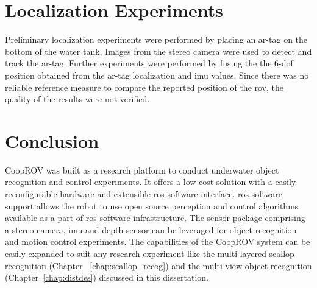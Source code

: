 \documentclass {udthesis}
\begin{document}
\section{Localization Experiments}

Preliminary localization experiments were performed by placing an \gls{ar}-tag on the bottom of the water tank. Images from the stereo camera were used to detect and track the \gls{ar}-tag. Further experiments were performed by fusing the the 6-\gls{dof} position obtained from the \gls{ar}-tag localization and \gls{imu} values. Since there was no reliable reference measure to compare the reported position of the \gls{rov}, the quality of the results were not verified.


\section{Conclusion}

CoopROV was built as a research platform to conduct underwater object recognition and control experiments. It offers a low-cost solution with a easily reconfigurable hardware and extensible \gls{ros}-software interface. \gls{ros}-software support allows the robot to use open source perception and control algorithms available as a part of \gls{ros} software infrastructure. The sensor package comprising a stereo camera, \gls{imu} and depth sensor can be leveraged for object recognition and motion control experiments. The capabilities of the CoopROV system can be easily expanded to suit any research experiment like the multi-layered scallop recognition (Chapter ~\ref{chap:scallop_recog}) and the multi-view object recognition (Chapter~\ref{chap:distdes}) discussed in this dissertation.

\printglossary[type=\acronymtype]                  
\end{document}
